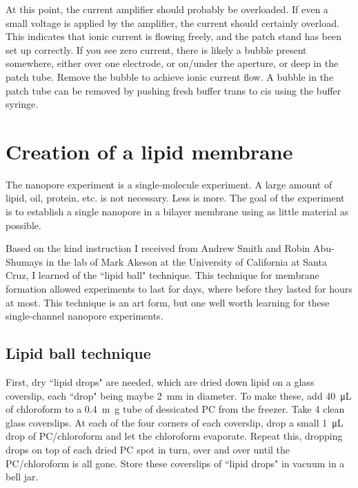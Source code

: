 At this point, the current amplifier should probably be overloaded.  If even a small voltage is applied by the amplifier, the current should certainly overload.  This indicates that ionic current is flowing freely, and the patch stand has been set up correctly.  If you see zero current, there is likely a bubble present somewhere, either over one electrode, or on/under the aperture, or deep in the patch tube.  Remove the bubble to achieve ionic current flow.  A bubble in the patch tube can be removed by pushing fresh buffer trans to cis using the buffer syringe.

\section{Creation of a lipid membrane}

The nanopore experiment is a single-molecule experiment.  A large amount of lipid, oil, protein, etc. is not necessary.  Less is more.  The goal of the experiment is to establish a single nanopore in a bilayer membrane using as little material as possible.

Based on the kind instruction I received from Andrew Smith and Robin Abu-Shumays in the lab of Mark Akeson at the University of California at Santa Cruz, I learned of the ``lipid ball" technique.  This technique for membrane formation allowed experiments to last for days, where before they lasted for hours at most.  This technique is an art form, but one well worth learning for these single-channel nanopore experiments.

\subsection{Lipid ball technique}

First, dry ``lipid drops" are needed, which are dried down lipid on a glass coverslip, each ``drop" being maybe \SI{2}{\mm} in diameter.  To make these, add \SI{40}{\micro\L} of chloroform to a \SI{0.4}{\m\g} tube of dessicated PC from the freezer.  Take \num{4} clean glass coverslips.  At each of the four corners of each coverslip, drop a small \SI{1}{\micro\L} drop of PC/chloroform and let the chloroform evaporate.  Repeat this, dropping drops on top of each dried PC spot in turn, over and over until the PC/chloroform is all gone.  Store these coverslips of ``lipid drops" in vacuum in a bell jar.

